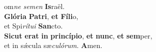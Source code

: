 \evenverse om\textit{ne} \textit{se}\textit{men} \textbf{Is}raël.\\
\oddverse \textbf{Gló}\textbf{ri}\textbf{a} \textbf{Pa}\textbf{tri}, \textbf{et} \textbf{Fí}\textbf{li}o,~\*\\
\oddverse et Spi\textit{rí}\textit{tu}\textit{i} \textbf{San}cto.\\
\evenverse \textbf{Si}\textbf{cut} \textbf{e}\textbf{rat} \textbf{in} \textbf{prin}\textbf{cí}\textbf{pi}\textbf{o}, \textbf{et} \textbf{nunc}, \textbf{et} \textbf{sem}per,~\*\\
\evenverse et in sǽcula sæ\textit{cu}\textit{ló}\textit{rum}. \textbf{A}men.\\
